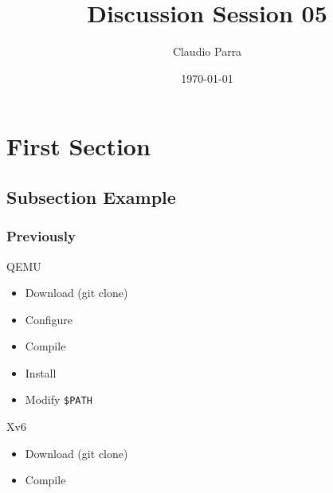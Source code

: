 \documentclass{beamer}
\title[GDB]{Discussion Session 05} %
\author{Claudio Parra} %
\institute[UCI] %
{
University of California \\ %
\medskip
\textit{parraca@uci.edu} %
}
\date{\today} %
\begin{document}
\begin{frame}
\titlepage %
\end{frame}



\section{First Section} %

\subsection{Subsection Example} %

\begin{frame}
  \frametitle{Previously}
  QEMU
  \begin{itemize}
  \item Download (git clone)
  \item Configure
  \item Compile
  \item Install
  \item Modify \texttt{\$PATH}
  \end{itemize}
  Xv6
  \begin{itemize}
  \item Download (git clone)
  \item Compile
  \end{itemize}
\end{frame}
\end{document}
